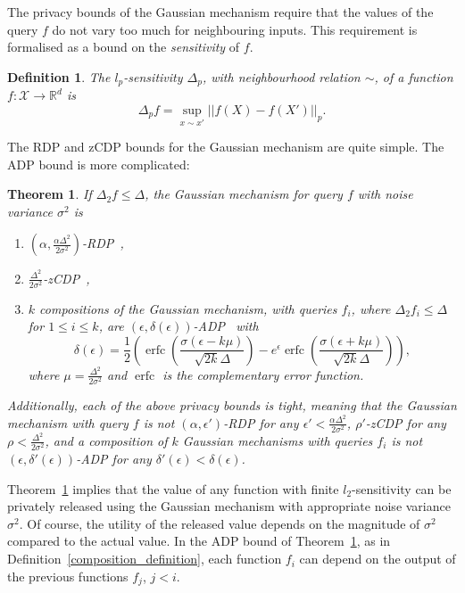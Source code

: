 \documentclass[english,twoside,openright]{HYgraduMLDS}
\newtheorem{theorem}[lemma]{Theorem}
\newtheorem{definition}[lemma]{Definition}
\newcommand{\R}{\mathbb{R}}
\newcommand{\calx}{{\mathcal{X}}}
\DeclareMathOperator{\erfc}{erfc}
\begin{document}
The privacy bounds of the Gaussian mechanism require that the values of the
query \(f\) do not vary too much for neighbouring inputs. This requirement
is formalised as a bound on the \emph{sensitivity} of \(f\).
\begin{definition}
    The \(l_p\)-sensitivity \(\Delta_p\), with neighbourhood relation \(\sim\),
    of a function \(f\colon \calx \to \R^d\)
    is
    \[
        \Delta_p f = \sup_{x\sim x'}||f(X) - f(X')||_p.
    \]
\end{definition}

The RDP and zCDP bounds for the Gaussian 
mechanism are quite simple. The ADP bound is more complicated:

\begin{theorem}\label{gauss-DP-bounds}
  If \(\Delta_{2}f \leq \Delta\), the Gaussian mechanism for query \(f\) with
  noise variance \(\sigma^{2}\) is
    \begin{enumerate}
        \item 
            \((\alpha, \frac{\alpha \Delta^2}{2\sigma^2})\)-RDP~\cite{Mironov17},
        \item 
            \(\frac{\Delta^2}{2\sigma^2}\)-zCDP~\cite{BuS16},
        \item 
            \(k\) compositions of the Gaussian mechanism, with
            queries \(f_{i}\), where \(\Delta_{2}f_{i}\leq \Delta\) for
            \(1\leq i \leq k\), are
            \((\epsilon, \delta(\epsilon))\)-ADP~\cite{Sommer2019} with 
            \[
                \delta(\epsilon) 
                = \frac{1}{2}\left(
                    \erfc\left(\frac{\sigma(\epsilon - k\mu)}{\sqrt{2k}\Delta}\right)
                    - e^\epsilon \erfc\left(\frac{\sigma(\epsilon + k\mu)}{\sqrt{2k}\Delta}\right)
                \right),
            \]
            where \(\mu = \frac{\Delta^2}{2\sigma^2}\) and \(\erfc\) is 
            the complementary error function.
    \end{enumerate}
    Additionally, each of the above privacy bounds is tight, meaning that
    the Gaussian mechanism with query \(f\) is not \((\alpha, \epsilon')\)-RDP
    for any \(\epsilon' < \frac{\alpha\Delta^{2}}{2\sigma^{2}}\), \(\rho'\)-zCDP
    for any \(\rho < \frac{\Delta^{2}}{2\sigma^{2}}\), and a composition
    of \(k\) Gaussian mechanisms with queries \(f_{i}\) is not
    \((\epsilon, \delta'(\epsilon))\)-ADP for any
    \(\delta'(\epsilon) < \delta(\epsilon)\).
\end{theorem}

Theorem~\ref{gauss-DP-bounds} implies that the value of any function with
finite \(l_2\)-sensitivity can be privately released using the Gaussian mechanism
with appropriate noise variance \(\sigma^2\). Of course, the utility of the
released value depends on the magnitude of \(\sigma^2\) compared to the actual
value. In the ADP bound of Theorem~\ref{gauss-DP-bounds},
as in Definition~\ref{composition_definition}, each function \(f_{i}\)
can depend on the output of the previous functions \(f_{j}\), \(j < i\).
\end{document}
